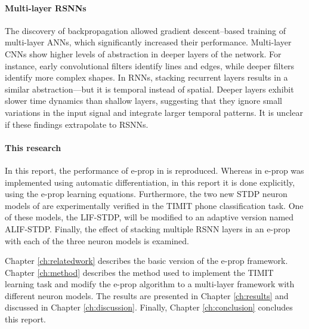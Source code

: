 \paragraph{Multi-layer RSNNs}
The discovery of backpropagation allowed gradient descent--based training of multi-layer ANNs, which significantly increased their performance.
Multi-layer CNNs show higher levels of abstraction in deeper layers of the network.
For instance, early convolutional filters identify lines and edges, while deeper filters identify more complex shapes.
In RNNs, stacking recurrent layers results in a similar abstraction---but it is temporal instead of spatial.
Deeper layers exhibit slower time dynamics than shallow layers, suggesting that they ignore small variations in the input signal and integrate larger temporal patterns.
It is unclear if these findings extrapolate to RSNNs.

\paragraph{This research}
In this report, the performance of e-prop in \citet{bellec2020solution} is reproduced.
Whereas in \citet{bellec2020solution} e-prop was implemented using automatic differentiation, in this report it is done explicitly, using the e-prop learning equations.
Furthermore, the two new STDP neuron models of \citet{traub2020learning} are experimentally verified in the TIMIT phone classification task.
One of these models, the LIF-STDP, will be modified to an adaptive version named ALIF-STDP.
Finally, the effect of stacking multiple RSNN layers in an e-prop with each of the three neuron models is examined.

Chapter \ref{ch:relatedwork} describes the basic version of the e-prop framework.
Chapter \ref{ch:method} describes the method used to implement the TIMIT learning task and modify the e-prop algorithm to a multi-layer framework with different neuron models.
The results are presented in Chapter \ref{ch:results} and discussed in Chapter \ref{ch:discussion}.
Finally, Chapter \ref{ch:conclusion} concludes this report.
